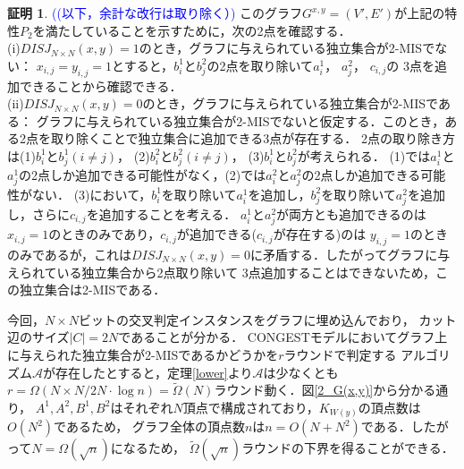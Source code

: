 \documentclass[12pt]{thesis}
\newcommand{\Izumi}[1]{\textcolor{blue}{(#1)}}
\newcommand{\CONGEST}{\textsf{CONGEST}}
\theoremstyle{definition}
\newtheorem*{prf*}{証明}
\begin{document}
\begin{prf*}
\Izumi{(以下，余計な改行は取り除く）}
このグラフ$G^{x, y} = (V', E')$が上記の特性$P_{2}$を満たしていることを示すために，次の2点を確認する． \\
(i)$DISJ_{N \times N} (x, y) = 1$のとき，グラフに与えられている独立集合が2-MISでない： 
$x_{i, j} = y_{i, j} =1$とすると，$b_{i}^{1}$と$b_{j}^{2}$の2点を取り除いて$a_{i}^{1}$， $a_{j}^{2}$， $c_{i, j}$の
3点を追加できることから確認できる． \\
(ii)$DISJ_{N \times N} (x, y) = 0$のとき，グラフに与えられている独立集合が2-MISである： 
グラフに与えられている独立集合が2-MISでないと仮定する．このとき，ある2点を取り除くことで独立集合に追加できる3点が存在する．
2点の取り除き方は(1)$b_{i}^{1}$と$b_{j}^{1}(i \neq j)$， (2)$b_{i}^{2}$と$b_{j}^{2}(i \neq j)$， (3)$b_{i}^{1}$と$b_{j}^{2}$が考えられる．
(1)では$a_{i}^{1}$と$a_{j}^{1}$の2点しか追加できる可能性がなく，(2)では$a_{i}^{2}$と$a_{j}^{2}$の2点しか追加できる可能性がない．
(3)において，$b_{i}^{1}$を取り除いて$a_{i}^{1}$を追加し，$b_{j}^{2}$を取り除いて$a_{j}^{2}$を追加し，さらに$c_{i, j}$を追加することを考える．
$a_{i}^{1}$と$a_{j}^{2}$が両方とも追加できるのは$x_{i, j} = 1$のときのみであり，$c_{i, j}$が追加できる($c_{i, j}$が存在する)のは
$y_{i, j} = 1$のときのみであるが，これは$DISJ_{N \times N} (x, y) = 0$に矛盾する．したがってグラフに与えられている独立集合から2点取り除いて
3点追加することはできないため，この独立集合は2-MISである．

今回，$N \times N$ビットの交叉判定インスタンスをグラフに埋め込んでおり，
カット辺のサイズ$|C| = 2N$であることが分かる．
{\CONGEST}モデルにおいてグラフ上に与えられた独立集合が2-MISであるかどうかを$r$ラウンドで判定する
アルゴリズム$\mathcal{A}$が存在したとすると，定理\ref{lower}より$\mathcal{A}$は少なくとも
$r = \Omega (N \times N/ 2N \cdot \log n) = \tilde{\Omega}(N)$ラウンド動く．図\ref{2_G(x,y)}から分かる通り，
$A^{1}, A^{2}, B^{1}, B^{2}$はそれぞれ$N$頂点で構成されており，$K_{W(y)}$の頂点数は$O(N^{2})$であるため，
グラフ全体の頂点数$n$は$n = O(N + N^{2})$である．したがって$N = \Omega(\sqrt{n})$になるため，
$\tilde{\Omega}(\sqrt{n})$ラウンドの下界を得ることができる．
\end{prf*}
\newpage
\end{document}
